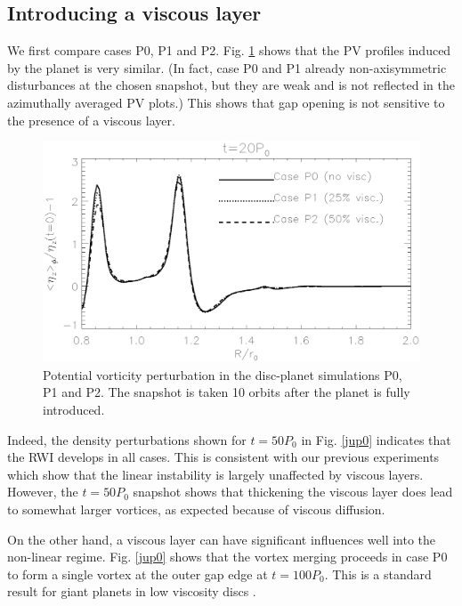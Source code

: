 \subsection{Introducing a viscous layer}
We first compare cases P0, P1 and P2. Fig. \ref{planet_gap} 
shows that the PV profiles induced by the planet is very
similar. (In fact, case P0 and P1 already non-axisymmetric
disturbances at the chosen snapshot, but they are weak and is not
reflected in the azimuthally averaged PV plots.) This shows that gap
opening is not sensitive to the presence of a viscous layer.  

\begin{figure}
  \centering
  \includegraphics[width=\linewidth]{figures/pdisk_vorten1d_cases_002.ps}
  \caption{Potential vorticity perturbation in the disc-planet
    simulations P0, P1 and P2. The snapshot is taken 10 orbits after
    the planet is fully introduced. %
    \label{planet_gap}}
\end{figure}

Indeed, the density perturbations shown for $t=50P_0$ in
Fig. \ref{jup0} indicates that the RWI develops in all cases. This is
consistent with our previous experiments which show that the linear
instability is largely unaffected by viscous layers. However,   
the $t=50P_0$ snapshot shows that thickening the viscous layer does lead
to somewhat larger vortices, as expected because of viscous diffusion.   

On the other hand, a viscous layer can have significant influences  
well into the non-linear regime. Fig. \ref{jup0} shows that the vortex
merging proceeds in case P0 to form a single vortex at the outer gap
edge at $t=100P_0$. This is a standard result for giant planets in
low viscosity discs \citep{valborro06,valborro07}.  

